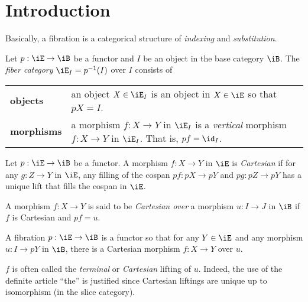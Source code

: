 \documentclass{amsart}
\title{}
\author{Frank Tsai}
\date{\today}
\begin{document}
\maketitle
\tableofcontents

\section{Introduction}
\label{sec:introduction}
Basically, a fibration is a categorical structure of \emph{indexing} and \emph{substitution}.

\begin{defn}
  Let $p : \iE \to \iB$ be a functor and $I$ be an object in the base category $\iB$.
  The \emph{fiber category} $\iE_{I} = p\inv(I)$ over $I$ consists of
  \begin{center}
    \begin{tabularx}{\linewidth}{lX}
      \textbf{objects} & an object $X \in \iE_{I}$ is an object in $X \in \iE$ so that $pX = I$.\\
      \textbf{morphisms} & a morphism $f : X \to Y$ in $\iE_{I}$ is a \emph{vertical} morphism $f : X \to Y$ in $\iE_{I}$.
                           That is, $pf = \id_{I}$.
    \end{tabularx}
  \end{center}
\end{defn}

\begin{defn}
  Let $p : \iE \to \iB$ be a functor.
  A morphism $f : X \to Y$ in $\iE$ is \emph{Cartesian} if for any $g : Z \to Y$ in $\iE$, any filling of the cospan $pf : pX \to pY$ and $pg : pZ \to pY$ has a unique lift that fills the cospan in $\iE$.
  
  
  A morphism $f : X \to Y$ is said to be \emph{Cartesian over} a morphism $u : I \to J$ in $\iB$ if $f$ is Cartesian and $pf = u$.
\end{defn}

\begin{defn}
  A fibration $p : \iE \to \iB$ is a functor so that for any $Y \in \iE$ and any morphism $u : I \to pY$ in $\iB$, there is a Cartesian morphism $f : X \to Y$ over $u$.
  

  $f$ is often called the \emph{terminal} or \emph{Cartesian} lifting of $u$.
  Indeed, the use of the definite article ``the'' is justified since Cartesian liftings are unique up to isomorphism (in the slice category).
\end{defn}
\end{document}

